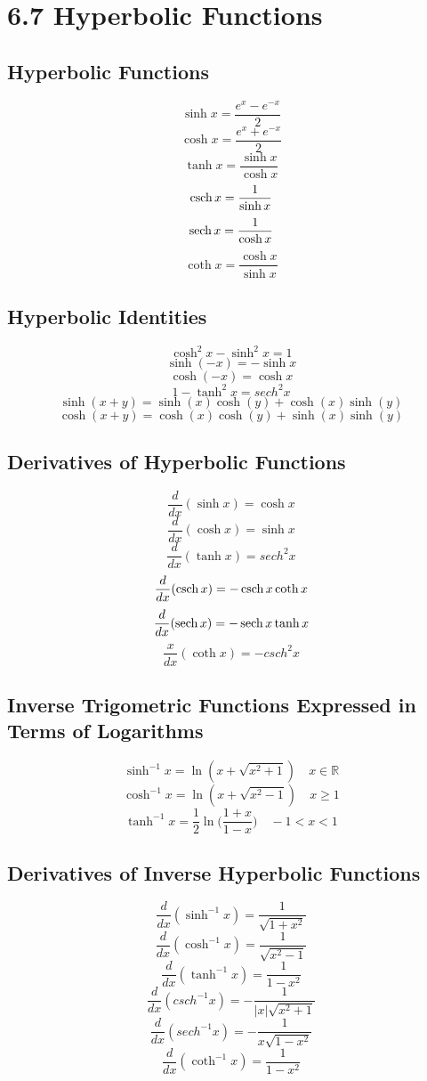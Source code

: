 %
%

\section*{6.7 Hyperbolic Functions}

\subsection*{Hyperbolic Functions}

\[ \sinh x = \frac{e^x-e^{-x}}{2} \]
\[ \cosh x = \frac{e^x + e^{-x}}{2} \]
\[ \tanh x = \frac{\sinh x}{\cosh x} \]
\[ \operatorname*{csch} x = \frac{1}{\sinh x} \]
\[ \operatorname*{sech} x = \frac{1}{\cosh x} \]
\[ \coth x = \frac{\cosh x}{\sinh x} \]

\subsection*{Hyperbolic Identities}

\[ \cosh^2x - \sinh^2x = 1 \]
\[ \sinh(-x) = -\sinh x \]
\[ \cosh(-x) = \cosh x \]
\[ 1 - \tanh^2x = {sech}^2 x \]
\[ \sinh(x+y) = \sinh(x) \cosh(y) + \cosh(x) \sinh(y) \]
\[ \cosh(x+y) = \cosh(x) \cosh(y) + \sinh(x) \sinh(y) \]

\subsection*{Derivatives of Hyperbolic Functions}

\[ \frac{d}{dx}(\sinh{x}) = \cosh{x} \]
\[ \frac{d}{dx}(\cosh{x}) = \sinh{x} \]
\[ \frac{d}{dx}(\tanh{x}) = {sech}^2 x \]
\[ \frac{d}{dx}(\operatorname*{csch}{x}) = - \operatorname*{csch}{x} \coth{x} \]
\[ \frac{d}{dx}(\operatorname*{sech}{x}) = - \operatorname*{sech}{x} \tanh{x} \]
\[ \frac{x}{dx}(\coth{x}) = - {csch}^2{x} \]

\subsection*{Inverse Trigometric Functions Expressed in Terms of Logarithms}

\[ \sinh^{-1}{x} = \ln(x+\sqrt{x^2 + 1}) \quad x \in \mathbb{R} \]
\[ \cosh^{-1}{x} = \ln(x + \sqrt{x^2-1}) \quad x \geq 1 \]
\[ \tanh^{-1}{x} = \frac{1}{2} \ln \bigg( \frac{1+x}{1-x} \bigg) \quad -1 < x < 1 \]

\subsection*{Derivatives of Inverse Hyperbolic Functions}

\[ \frac{d}{dx}(\sinh^{-1}x) = \frac{1}{\sqrt{1+x^2}} \]
\[ \frac{d}{dx}(\cosh^{-1}x) = \frac{1}{\sqrt{x^2 -1}} \]
\[ \frac{d}{dx}(\tanh^{-1}x) = \frac{1}{1-x^2} \]
\[ \frac{d}{dx}({csch}^{-1}x) = - \frac{1}{|x| \sqrt{x^2 + 1}} \]
\[ \frac{d}{dx}({sech}^{-1}x) = - \frac{1}{x \sqrt{1 - x^2}} \]
\[ \frac{d}{dx}(\coth^{-1}x) = \frac{1}{1-x^2} \]
